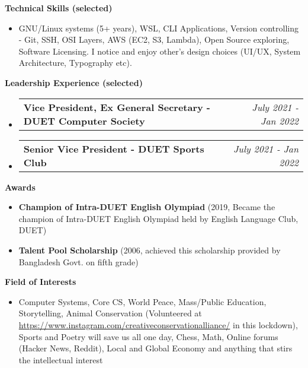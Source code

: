 \documentclass[letterpaper,10pt]{article}
\makeatletter
\newcommand{\resheading}[1]{{\large \colorbox{mygrey}{\begin{minipage}{\textwidth}{\textbf{#1 \vphantom{p\^{E}}}}\end{minipage}}}}
\newcommand{\ressubheading}[4]{
	\begin{tabular*}{7.1in}{l@{\extracolsep{\fill}}r}
		\textbf{#1} & \textit{#4} \\
	\end{tabular*}\vspace{-6pt}}
\makeatother
\begin{document}
	\vspace{0.2in}
	
	\resheading{Technical Skills (selected)}
	\begin{itemize}
		\item GNU/Linux systems (5+ years), WSL, CLI Applications, Version controlling - Git, SSH, OSI Layers, AWS (EC2, S3, Lambda), Open Source exploring, Software Licensing. I notice and enjoy other's design choices (UI/UX, System Architecture, Typography etc).
	\end{itemize}

	\vspace{0.2in}
	
	\resheading{Leadership Experience (selected)}
	\begin{itemize}
		\item \ressubheading{Vice President, Ex General Secretary - DUET Computer Society}{}{}{July 2021 - Jan 2022}
		\item \ressubheading{Senior Vice President - DUET Sports Club}{}{}{July 2021 - Jan 2022}
		
	\end{itemize}

	\vspace{0.3in}
	
	\resheading{Awards}
	\begin{itemize}
				
		\item \textbf{Champion of Intra-DUET English Olympiad} (2019, Became the champion of Intra-DUET English Olympiad held by English Language Club, DUET)
	
		\item \textbf{Talent Pool Scholarship} (2006, achieved this scholarship provided by Bangladesh Govt. on fifth grade) 

	\end{itemize}

	\vspace{0.2in}
	
	\resheading{Field of Interests}
		\begin{itemize}
			\item Computer Systems, Core CS,  World Peace, Mass/Public Education, Storytelling, Animal Conservation (Volunteered at \url{https://www.instagram.com/creativeconservationalliance/} in this lockdown), Sports and Poetry will save us all one day, Chess, Math, Online forums (Hacker News, Reddit), Local and Global Economy and anything that stirs the intellectual interest
		\end{itemize}

    \vfill
    
\end{document}
